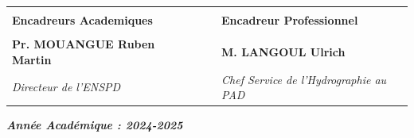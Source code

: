 \documentclass[a4paper,12pt]{article}
\begin{document}
\begin{titlepage}
\begin{center}
\end{center}
\begin{center}
	\normalsize 
	\begin{tabular}{llcl}
		\vspace{\stretch{1}}\\
		\textbf{Encadreurs Academiques} & & & \textbf{Encadreur Professionnel}\\
	\\
		\textbf{Pr. MOUANGUE Ruben Martin} & & & \textbf{M. LANGOUL Ulrich}\\
		\textit{\footnotesize{Directeur de  l'ENSPD}} & & &  \textit{\footnotesize{Chef Service de l’Hydrographie au PAD}}\\
		
		
	\end{tabular}
\end{center}
\noindent \normalsize\textbf{\textit{Année Académique : 2024-2025\\}}
	\end{titlepage}
	
	
	
	
	
	
\end{document}
